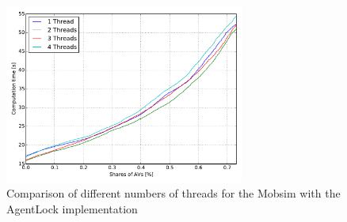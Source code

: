 
\begin{figure}
    \centering
    \includegraphics[width=0.7\textwidth]{figures/threads.pdf}
    \caption{Comparison of different numbers of threads for the Mobsim with the AgentLock implementation}
    \label{fig:threads}
\end{figure}
